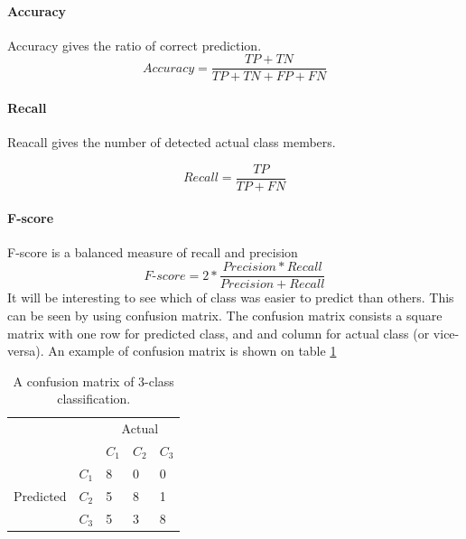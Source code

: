 \documentclass[USenglish]{ifimaster}  %
\begin{document}
\paragraph{Accuracy}
Accuracy gives the ratio of correct prediction. 
\begin{equation}
Accuracy = \frac{TP + TN}{TP + TN + FP + FN}
\label{eq:acc}
\end{equation}

\paragraph{Recall}
Reacall gives the number of detected actual class members.

\begin{equation}
Recall = \frac{TP}{TP + FN}
\label{eq:recall}
\end{equation}

\paragraph{F-score}
F-score is a balanced measure of recall and precision 
\begin{equation}
\textit{F-score} = 2*\frac{Precision*Recall}{Precision + Recall}
\label{eq:fscore}
\end{equation}
\FloatBarrier
It will be interesting to see which of class was easier to predict than others. This can be seen by using confusion matrix. The confusion matrix consists a square matrix with one row for predicted class, and and column for actual class (or vice-versa).
An example of confusion matrix is shown on table \ref{tab:cmatrix}

\begin{table}[h]
	\centering
	\begin{tabular}{ll|l|l|l|}
		\cline{3-5}
		&  & \multicolumn{3}{c|}{Actual} \\ \cline{3-5} 
		&  & $C_1$ & $C_2$ & $C_3$ \\ \hline
		\multicolumn{1}{|l|}{\multirow{3}{*}{Predicted}} & $C_1$ & 8 & 0 & 0 \\ \cline{2-5} 
		\multicolumn{1}{|l|}{} & $C_2$ & 5 & 8 & 1 \\ \cline{2-5} 
		\multicolumn{1}{|l|}{} & $C_3$ & 5 & 3 & 8 \\ \hline
	\end{tabular}
	\caption{A confusion matrix of 3-class classification.}
	\label{tab:cmatrix}
\end{table}
\end{document}
